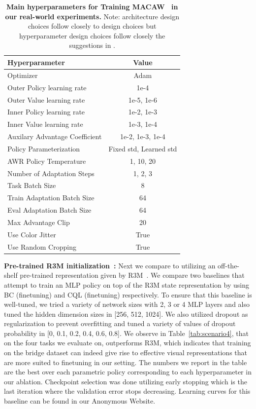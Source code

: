 \documentclass[conference]{IEEEtran}
\begin{document}
\begin{table}[h]
\centering
\begin{tabular}{l|c}
\toprule
\textbf{Hyperparameter} & \textbf{Value}\\  \midrule
Optimizer & Adam \\
Outer Policy learning rate & 1e-4 \\
Outer Value learning rate & 1e-5, 1e-6 \\
Inner Policy learning rate & 1e-2, 1e-3 \\
Inner Value learning rate & 1e-3, 1e-4 \\
Auxilary Advantage Coefficient & 1e-2, 1e-3, 1e-4 \\
Policy Parameterization & Fixed std, Learned std \\
AWR Policy Temperature & 1, 10, 20 \\
Number of Adaptation Steps & 1, 2, 3 \\
Task Batch Size & 8 \\
Train Adaptation Batch Size & 64 \\
Eval Adaptation Batch Size & 64 \\
Max Advantage Clip & 20 \\
Use Color Jitter & True \\
Use Random Cropping & True \\

\bottomrule
\end{tabular}
\vspace{0.07cm}
\caption{{\footnotesize{\textbf{Main hyperparameters for Training MACAW~\citep{2020arXiv200806043M} in our real-world experiments.} Note: architecture design choices follow closely to \methodname design choices but hyperparameter design choices follow closely the suggestions in \citet{2020arXiv200806043M}.}}}
\label{tab:hparams_macaw}
\vspace{-0.2cm}
\end{table}

\textbf{Pre-trained R3M initialization~\citep{nair2022r3m}:} Next we compare \methodname to utilizing an off-the-shelf pre-trained representation given by R3M~\citep{nair2022r3m}. We compare two baselines that attempt to train an MLP policy on top of the R3M state representation by using BC (finetuning) and CQL (finetuning) respectively. To ensure that this baseline is well-tuned, we tried a variety of network sizes with 2, 3 or 4 MLP layers and also tuned the hidden dimension sizes in [256, 512, 1024]. We also utilized dropout as regularization to prevent overfitting and tuned a variety of values of dropout probability in [0, 0.1, 0.2, 0.4, 0.6, 0.8]. We observe in Table~\ref{tab:scenario4}, that on the four tasks we evaluate on, \methodname outperforms R3M, which indicates that training on the bridge dataset can indeed give rise to effective visual representations that are more suited to finetuning in our setting. The numbers we report in the table are the best over each parametric policy corresponding to each hyperparameter in our ablation. Checkpoint selection was done utilizing early stopping which is the last iteration where the validation error stops decreasing. Learning curves for this baseline can be found in our Anonymous Website.
\end{document}
